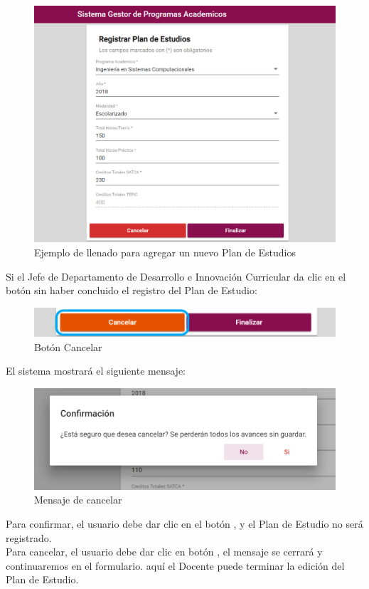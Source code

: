 \begin{figure}[!hbtp]
	\centering
	\hypertarget{ejreg}{\includegraphics[width=0.7\linewidth]{images/SP4-GPE/registrarEjem}}
	\caption{Ejemplo de llenado para agregar un nuevo Plan de Estudios}
	\label{ejreg}
\end{figure}
Si el Jefe de Departamento de Desarrollo e Innovación Curricular da clic en el botón  sin haber concluido el registro del Plan de Estudio:

\begin{figure}[!hbtp]
	\centering
	\hypertarget{cancel2}{\includegraphics[width=0.7\linewidth]{images/SP4-GPE/cancelarPE}}
	\caption{Botón Cancelar}
	\label{cancel2}
\end{figure}
\newpage

El sistema mostrará el siguiente mensaje:
\begin{figure}[!hbtp]
	\centering
	\hypertarget{ms1}{\includegraphics[width=0.7\linewidth]{images/SP4-GPE/m1}}
	\caption{Mensaje de cancelar}
	\label{ms1}
\end{figure}

Para confirmar, el usuario debe dar clic en el botón  , y el Plan de Estudio no será registrado.\\

Para cancelar, el usuario debe dar clic en botón  , el mensaje se cerrará y continuaremos en el formulario. aquí el Docente puede terminar la edición del Plan de Estudio.

